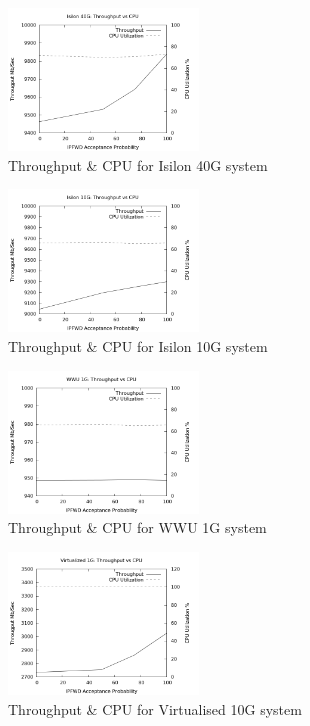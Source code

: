 \documentclass[journal]{IEEEtran}
\begin{document}
    \begin{figure}[h]
      \includegraphics[width=0.45\textwidth]{cpu_isilon40}
      \caption{Throughput \& CPU for Isilon 40G system}
      \label{fig:isiloncpu40}
    \end{figure}
    \begin{figure}[h]
      \includegraphics[width=0.45\textwidth]{cpu_isilon10}
      \caption{Throughput \& CPU for Isilon 10G system}
      \label{fig:isiloncpu10}
    \end{figure}
    \begin{figure}[h]
      \includegraphics[width=0.45\textwidth]{cpu_wwu1}
      \caption{Throughput \& CPU for WWU 1G system}
      \label{fig:wwucpu1}
    \end{figure}
    \begin{figure}[h]
      \includegraphics[width=0.45\textwidth]{cpu_virtual10}
      \caption{Throughput \& CPU for Virtualised 10G system}
      \label{fig:virtualcpu10}
    \end{figure}
    
\end{document}
